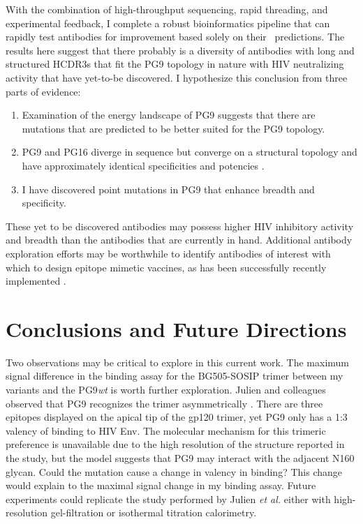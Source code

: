 With the combination of high-throughput sequencing, rapid threading, and experimental feedback, I complete a robust bioinformatics pipeline that can rapidly test antibodies for improvement based solely on their \silico~predictions. The results here suggest that there probably is a diversity of antibodies with long and structured HCDR3s that fit the PG9 topology in nature with HIV neutralizing activity that have yet-to-be discovered. I hypothesize this conclusion from three parts of evidence:
\begin{enumerate}
\item Examination of the energy landscape of PG9 suggests that there are mutations that are predicted to be better suited for the PG9 topology.
\item PG9 and PG16 diverge in sequence but converge on a structural topology and have approximately identical specificities and potencies \citep{McLellan:2011dg,Pejchal:2010fp,Pancera:2010hh}.
\item I have discovered point mutations in PG9 that enhance breadth and specificity.
\end{enumerate}
These yet to be discovered antibodies may possess higher HIV inhibitory activity and breadth than the antibodies that are currently in hand. Additional antibody exploration efforts may be worthwhile to identify antibodies of interest with which to design epitope mimetic vaccines, as has been successfully recently implemented \citep{Correia:2014jp,Jardine:2013hb}.



\section{Conclusions and Future Directions}
Two observations may be critical to explore in this current work. The maximum signal difference in the binding assay for the BG505-SOSIP trimer between my variants and the PG9\textit{wt} is worth further exploration. Julien and colleagues observed that PG9 recognizes the trimer asymmetrically \citep{Julien:2013jp}. There are three epitopes displayed on the apical tip of the gp120 trimer, yet PG9 only has a 1:3 valency of binding to HIV Env. The molecular mechanism for this trimeric preference is unavailable due to the high resolution of the structure reported in the study, but the model suggests that PG9 may interact with the adjacent N160 glycan. Could the mutation cause a change in valency in binding? This change would explain to the maximal signal change in my binding assay. Future experiments could replicate the study performed by Julien \textit{et al.} either with high-resolution gel-filtration or isothermal titration calorimetry.

